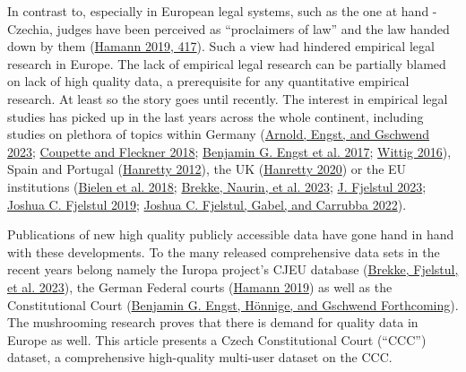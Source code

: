 \documentclass[
  11pt,
]{article}
\begin{document}
In contrast to, especially in European legal systems, such as the one at
hand - Czechia, judges have been perceived as ``proclaimers of law'' and
the law handed down by them
(\protect\hyperlink{ref-hamannGermanFederalCourts2019}{Hamann 2019,
417}). Such a view had hindered empirical legal research in Europe. The
lack of empirical legal research can be partially blamed on lack of high
quality data, a prerequisite for any quantitative empirical research. At
least so the story goes until recently. The interest in empirical legal
studies has picked up in the last years across the whole continent,
including studies on plethora of topics within Germany
(\protect\hyperlink{ref-arnoldScalingCourtDecisions2023}{Arnold, Engst,
and Gschwend 2023};
\protect\hyperlink{ref-coupetteQuantitativeRechtswissenschaft2018}{Coupette
and Fleckner 2018};
\protect\hyperlink{ref-engstEinflussParteinaheAuf2017}{Benjamin G. Engst
et al. 2017};
\protect\hyperlink{ref-wittigOccurrenceSeparateOpinions2016}{Wittig
2016}), Spain and Portugal
(\protect\hyperlink{ref-hanrettyDissentIberiaIdeal2012}{Hanretty 2012}),
the UK
(\protect\hyperlink{ref-hanrettyCourtSpecialistsJudicial2020}{Hanretty
2020}) or the EU institutions
(\protect\hyperlink{ref-bielenBacklogsLitigationRates2018}{Bielen et al.
2018}; \protect\hyperlink{ref-brekkeThatOrderHow2023}{Brekke, Naurin, et
al. 2023}; \protect\hyperlink{ref-fjelstulHowChamberSystem2023}{J.
Fjelstul 2023};
\protect\hyperlink{ref-fjelstulEvolutionEuropeanUnion2019}{Joshua C.
Fjelstul 2019};
\protect\hyperlink{ref-fjelstulTimelyAdministrationJustice2022}{Joshua
C. Fjelstul, Gabel, and Carrubba 2022}).

Publications of new high quality publicly accessible data have gone hand
in hand with these developments. To the many released comprehensive data
sets in the recent years belong namely the Iuropa project's CJEU
database (\protect\hyperlink{ref-brekkeCJEUDatabasePlatform2023}{Brekke,
Fjelstul, et al. 2023}), the German Federal courts
(\protect\hyperlink{ref-hamannGermanFederalCourts2019}{Hamann 2019}) as
well as the Constitutional Court
(\protect\hyperlink{ref-engstConstitutionalCourtDatabaseForthcoming}{Benjamin
G. Engst, Hönnige, and Gschwend Forthcoming}). The mushrooming research
proves that there is demand for quality data in Europe as well. This
article presents a Czech Constitutional Court (``CCC'') dataset, a
comprehensive high-quality multi-user dataset on the CCC.
\end{document}
